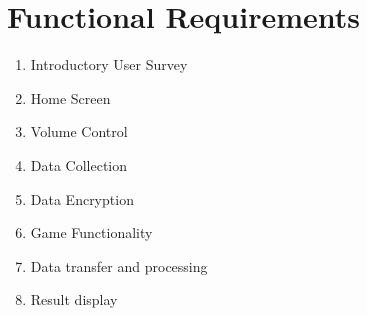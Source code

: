 \documentclass[a4wide]{article}
\begin{document}

%
%
%
%
%
%
%
%
%

\section{Functional Requirements}

\begin{enumerate}
\item Introductory User Survey
\item Home Screen
\item Volume Control
\item Data Collection
\item Data Encryption
\item Game Functionality
\item Data transfer and processing
\item Result display
\end{enumerate}
\end{document}
